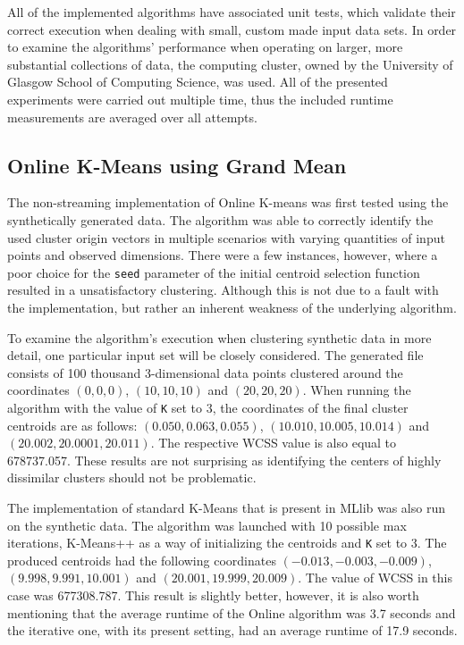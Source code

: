 \documentclass{l4proj}
\begin{document}
All of the implemented algorithms have associated unit tests, which validate their correct execution when dealing with small, custom made input data sets. In order to examine the algorithms' performance when operating on larger, more substantial collections of data, the computing cluster, owned by the University of Glasgow School of Computing Science, was used. All of the presented experiments were carried out multiple time, thus the included runtime measurements are averaged over all attempts.

\subsection{Online K-Means using Grand Mean}

The non-streaming implementation of Online K-means was first tested using the synthetically generated data. The algorithm was able to correctly identify the used  cluster origin vectors in multiple scenarios with varying quantities of input points and observed dimensions. There were a few instances, however, where a poor choice for the \texttt{seed} parameter of the initial centroid selection function resulted in a unsatisfactory clustering. Although this is not due to a fault with the implementation, but rather an inherent weakness of the underlying algorithm.

To examine the algorithm's execution when clustering synthetic data in more detail,  one particular input set will be closely considered. The generated file consists of  100 thousand 3-dimensional data points clustered around the coordinates $(0,0,0)$, $(10,10,10)$ and $(20,20,20)$. When running the algorithm with the value of \texttt{K} set to $3$, the coordinates of the final cluster centroids are as follows: $(0.050,0.063,0.055)$, $(10.010,10.005,10.014)$ and $(20.002,20.0001,20.011)$. The respective WCSS value is also equal to 678737.057. These results are not surprising as identifying the centers of highly dissimilar clusters should not be problematic.

The implementation of standard K-Means that is present in MLlib was also run on the synthetic data. The algorithm was launched with 10 possible max iterations, K-Means++ as a way of initializing the centroids and \texttt{K} set to 3. The produced centroids had the following coordinates $(-0.013, -0.003, -0.009)$, $(9.998, 9.991, 10.001)$ and $(20.001, 19.999, 20.009)$. The value of WCSS in this case was 677308.787. This result is slightly better, however, it is also worth mentioning that the average runtime of the Online algorithm was 3.7 seconds and the  iterative one, with its present setting, had an average runtime of 17.9 seconds.
\end{document}

